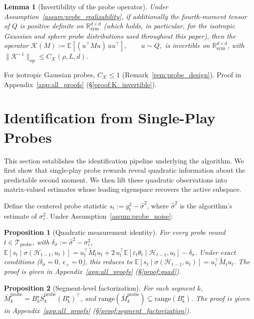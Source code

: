 \documentclass{article}
\newcommand{\R}{\mathbb{R}}
\newcommand{\E}{\mathbb{E}}
\newcommand{\op}{\mathrm{op}}
\newcommand{\cH}{\mathcal{H}}
\newcommand{\cTprobe}{\mathcal{T}_{\mathrm{probe}}}
\newcommand{\range}{\mathrm{range}}
\newtheorem{lemma}{Lemma}
\newtheorem{proposition}{Proposition}
\begin{document}
\begin{lemma}[Invertibility of the probe operator]\label{lem:K_invertible}
Under Assumption~\ref{assum:probe_realizability}, if additionally the fourth-moment tensor of $Q$ is positive definite on $\R_{\mathrm{sym}}^{d\times d}$ (which holds, in particular, for the isotropic Gaussian and sphere probe distributions used throughout this paper), then the operator $\mathcal K(M):=\E[(u^\top M u)\,uu^\top], \qquad u\sim Q,$ is invertible on $\R_{\mathrm{sym}}^{d\times d}$, with $\|\mathcal K^{-1}\|_{\op} \le C_{\mathcal K}(\rho, L, d)$.
\end{lemma}
For isotropic Gaussian probes, $C_{\mathcal K} \le 1$ (Remark~\ref{rem:probe_design}). Proof in Appendix~\ref{app:all_proofs} (\S\ref{proof:K_invertible}).
\section{Identification from Single-Play Probes}
\label{sec:identification}

This section establishes the identification pipeline underlying the algorithm.
We first show that single-play probe rewards reveal quadratic information about the predictable second moment.
We then lift these quadratic observations into matrix-valued estimates whose leading eigenspace recovers the active subspace.

Define the centered probe statistic $s_t := y_t^2 - \hat\sigma^2$, where $\hat\sigma^2$ is the algorithm's estimate of $\sigma_\varepsilon^2$.
Under Assumption~\ref{assum:probe_noise}:
\begin{proposition}[Quadratic measurement identity]
\label{prop:quad}
For every probe round $t \in \cTprobe$, with $\delta_\sigma := \hat\sigma^2 - \sigma_\varepsilon^2$,
$\E[s_t \mid \sigma(\cH_{t-1}, u_t)] = u_t^\top \widetilde{M}_t u_t + 2\,u_t^\top\E[\varepsilon_t\theta_t \mid \cH_{t-1}, u_t] - \delta_\sigma$.
Under exact conditions ($\delta_\sigma = 0$, $\epsilon_\times = 0$), this reduces to $\E[s_t \mid \sigma(\cH_{t-1}, u_t)] = u_t^\top \widetilde{M}_t u_t$.
The proof is given in Appendix~\ref{app:all_proofs} (\S\ref{proof:quad}).
\end{proposition} 


\begin{proposition}[Segment-level factorization]
\label{prop:segment_factorization}
For each segment $k$, $\bar M_k^{\mathrm{probe}} = B_k^\star \bar S_k^{\mathrm{probe}} (B_k^\star)^\top$, and $\range(\bar M_k^{\mathrm{probe}})\subseteq \range(B_k^\star)$.
The proof is given in Appendix~\ref{app:all_proofs} (\S\ref{proof:segment_factorization}).
\end{proposition}
\end{document}
